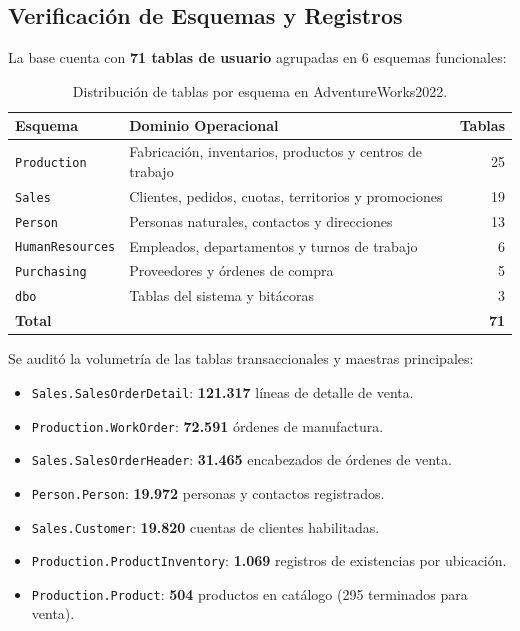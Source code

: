\documentclass[11pt,letterpaper]{article}
\begin{document}
\subsection{Verificación de Esquemas y Registros}
La base cuenta con \textbf{71 tablas de usuario} agrupadas en 6 esquemas funcionales:
\begin{table}[H]
\centering
\small
\begin{tabular}{llr}
\toprule
\textbf{Esquema} & \textbf{Dominio Operacional} & \textbf{Tablas} \\
\midrule
\texttt{Production} & Fabricación, inventarios, productos y centros de trabajo & 25 \\
\texttt{Sales} & Clientes, pedidos, cuotas, territorios y promociones & 19 \\
\texttt{Person} & Personas naturales, contactos y direcciones & 13 \\
\texttt{HumanResources} & Empleados, departamentos y turnos de trabajo & 6 \\
\texttt{Purchasing} & Proveedores y órdenes de compra & 5 \\
\texttt{dbo} & Tablas del sistema y bitácoras & 3 \\
\midrule
\textbf{Total} & & \textbf{71} \\
\bottomrule
\end{tabular}
\caption{Distribución de tablas por esquema en AdventureWorks2022.}
\end{table}

Se auditó la volumetría de las tablas transaccionales y maestras principales:
\begin{itemize}[leftmargin=*]
    \item \texttt{Sales.SalesOrderDetail}: \textbf{121.317} líneas de detalle de venta.
    \item \texttt{Production.WorkOrder}: \textbf{72.591} órdenes de manufactura.
    \item \texttt{Sales.SalesOrderHeader}: \textbf{31.465} encabezados de órdenes de venta.
    \item \texttt{Person.Person}: \textbf{19.972} personas y contactos registrados.
    \item \texttt{Sales.Customer}: \textbf{19.820} cuentas de clientes habilitadas.
    \item \texttt{Production.ProductInventory}: \textbf{1.069} registros de existencias por ubicación.
    \item \texttt{Production.Product}: \textbf{504} productos en catálogo (295 terminados para venta).
\end{itemize}
\end{document}
